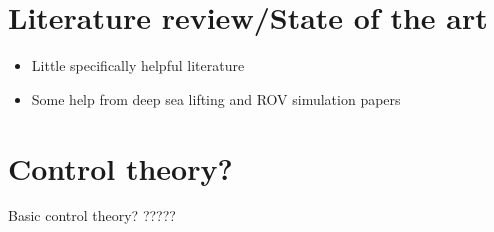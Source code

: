 \section{Literature review/State of the art}
\begin{itemize}
\item Little specifically helpful literature
\item Some help from deep sea lifting and ROV simulation papers

\end{itemize}

\section{Control theory?}
Basic control theory? ?????